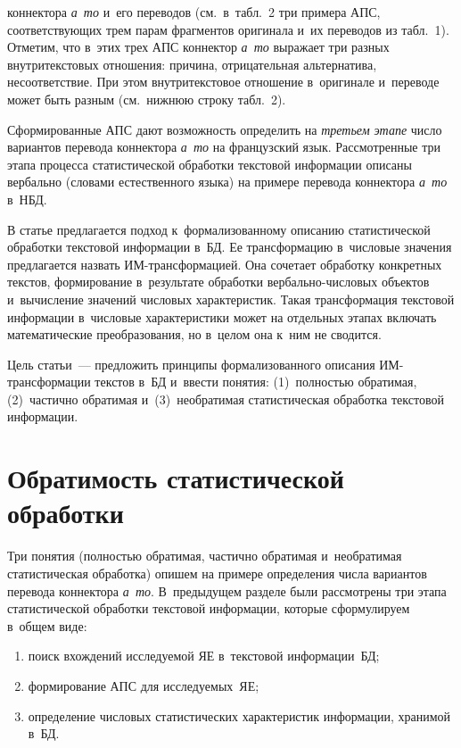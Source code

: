 \begin{multicols}{2}

\noindent
 коннектора \textit{а~то} и~его переводов (см.\ в~табл.~2 три
 примера АПС, со\-от\-вет\-ст\-ву\-ющих трем парам фрагментов оригинала и~их 
переводов из табл.~1). Отметим, что в~этих трех АПС коннектор \textit{а~то} 
выражает три раз\-ных внут\-ри\-текс\-то\-вых отношения: причина, отрицательная 
альтернатива, несоответствие. При этом внут\-ри\-текс\-то\-вое 
отношение в~оригинале и~переводе может быть раз\-ным (см.\ ниж\-нюю строку табл.~2).
  

   
  Сформированные АПС дают воз\-мож\-ность определить на \textit{треть\-ем 
этапе} чис\-ло вариантов перевода коннектора \textit{а~то} на французский язык. 
Рас\-смот\-рен\-ные три этапа процесса ста\-ти\-сти\-че\-ской обработки текс\-то\-вой 
информации описаны вербально (словами естественного языка) на примере 
перевода коннектора \textit{а~то} в~НБД.
  
  В статье предлагается подход к~фор\-ма\-ли\-зо\-ванному описанию статистической 
обработки \mbox{текс\-товой} информации в~БД. Ее трансформацию 
в~чис\-ло\-вые значения предлагается назвать  
ИМ-транс\-фор\-ма\-ци\-ей. Она 
сочетает обработку конкретных текс\-тов, формирование в~результате обработки 
вер\-баль\-но-чис\-ло\-вых объектов и~вы\-чис\-ле\-ние значений чис\-ло\-вых 
характеристик. Такая трансформация текс\-то\-вой информации в~чис\-ло\-вые 
характеристики может на отдельных этапах включать \mbox{математические} 
преобразования, но в~целом она к~ним не сво\-дится.
  
  Цель статьи~--- предложить принципы формализованного описания  
ИМ-транс\-фор\-ма\-ции текс\-тов в~БД и~ввести понятия: (1)~пол\-ностью 
обратимая, (2)~час\-ти\-чно обратимая и~(3)~необратимая статистическая обработка 
текс\-то\-вой ин\-фор\-ма\-ции.

\vspace*{-9pt}

\section{Обратимость статистической обработки}

\vspace*{-2pt}

  Три понятия (полностью обратимая, час\-тич\-но обратимая и~необратимая 
ста\-ти\-сти\-че\-ская обработка) опишем на примере определения чис\-ла вариантов 
перевода коннектора \textit{а~то}. В~предыдущем разделе были рас\-смот\-ре\-ны три 
этапа ста\-ти\-сти\-че\-ской обработки текс\-то\-вой информации, которые сформулируем 
в~общем \mbox{виде}:
  \begin{enumerate}[(1)]
\item поиск вхождений ис\-сле\-ду\-емой ЯЕ в~текс\-то\-вой ин\-фор\-ма\-ции~БД;
   \item формирование АПС для ис\-сле\-ду\-емых~ЯЕ;
   \item определение чис\-ло\-вых ста\-ти\-сти\-че\-ских характеристик информации, 
хранимой в~БД.
   \end{enumerate}
   

\end{multicols}
